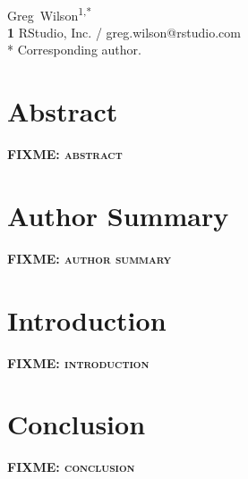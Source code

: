 \documentclass[10pt,letterpaper]{article}
\newcommand{\fixme}[1]{\textsc{\textbf{FIXME: {#1}}}}
\begin{document}
\vspace*{0.2in}

\begin{flushleft}
{\Large
\textbf{}
}
\newline
\\
{Greg~Wilson}\textsuperscript{1,*}
\\
\textbf{1} RStudio, Inc. / greg.wilson@rstudio.com
\\
\bigskip
* Corresponding author.
\end{flushleft}

\section*{Abstract}

\fixme{abstract}

\section*{Author Summary}

\fixme{author summary}

\section*{Introduction}

\fixme{introduction}

\section*{Conclusion}

\fixme{conclusion}

\nocite{*} %

\end{document}
